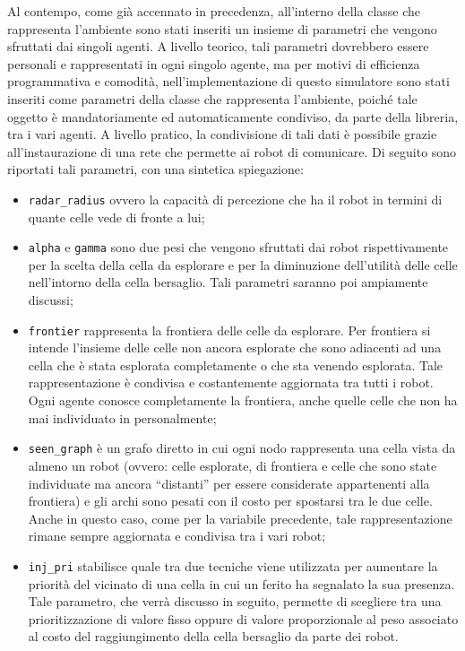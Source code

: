 Al contempo, come già accennato in precedenza, all'interno della classe che rappresenta l'ambiente sono stati inseriti un insieme di parametri che vengono sfruttati dai singoli agenti.
A livello teorico, tali parametri dovrebbero essere personali e rappresentati in ogni singolo agente, ma per motivi di efficienza programmativa e comodità, nell'implementazione di questo simulatore sono stati inseriti come parametri della classe che rappresenta l'ambiente, poiché tale oggetto è mandatoriamente ed automaticamente condiviso, da parte della libreria, tra i vari agenti. A livello pratico, la condivisione di tali dati è possibile grazie all'instaurazione di una rete che permette ai robot di comunicare.
Di seguito sono riportati tali parametri, con una sintetica spiegazione:
\begin{itemize}
	\item \texttt{radar\_radius} ovvero la capacità di percezione che ha il robot in termini di quante celle vede di fronte a lui;
	\item \texttt{alpha} e \texttt{gamma} sono due pesi che vengono sfruttati dai robot rispettivamente per la scelta della cella da esplorare e per la diminuzione dell'utilità delle celle nell'intorno della cella bersaglio. Tali parametri saranno poi ampiamente discussi;
	\item \texttt{frontier} rappresenta la frontiera delle celle da esplorare. Per frontiera si intende l'insieme delle celle non ancora esplorate che sono adiacenti ad una cella che è stata esplorata completamente o che sta venendo esplorata. Tale rappresentazione è condivisa e costantemente aggiornata tra tutti i robot. Ogni agente conosce completamente la frontiera, anche quelle celle che non ha mai individuato in personalmente;
	\item \texttt{seen\_graph} è un grafo diretto in cui ogni nodo rappresenta una cella vista da almeno un robot (ovvero: celle esplorate, di frontiera e celle che sono state individuate ma ancora “distanti” per essere considerate appartenenti alla frontiera) e gli archi sono pesati con il costo per spostarsi tra le due celle. Anche in questo caso, come per la variabile precedente, tale rappresentazione rimane sempre aggiornata e condivisa tra i vari robot;
	\item \texttt{inj\_pri} stabilisce quale tra due tecniche viene utilizzata per aumentare la priorità del vicinato di una cella in cui un ferito ha segnalato la sua presenza. Tale parametro, che verrà discusso in seguito, permette di scegliere tra una prioritizzazione di valore fisso oppure di valore proporzionale al peso associato al costo del raggiungimento della cella bersaglio da parte dei robot.
\end{itemize}